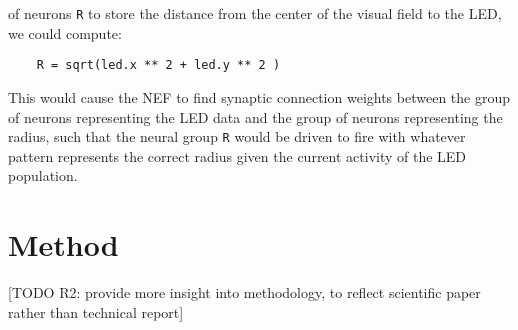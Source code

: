 \documentclass[conference]{IEEEtran}
\begin{document}
of neurons \texttt{R} to store the distance from the center of the visual field to the LED, we could compute: 
\begin{lstlisting}
	R = sqrt(led.x ** 2 + led.y ** 2 )
\end{lstlisting}

This would cause the NEF to find synaptic connection weights between the group of neurons representing the LED data and the group of neurons representing the radius, such that the neural group \texttt{R} would be driven to fire with whatever pattern represents the correct radius given the
current activity of the LED population.

\section{Method}
[TODO R2: provide more insight into methodology, to reflect scientific paper rather than technical report]
\end{document}
